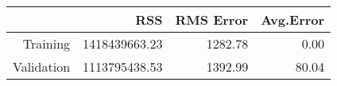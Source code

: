 \documentclass[11pt,letterpaper]{article}%
\begin{document}
\begin{center}%
\begin{tabular}{rrrr}
  \hline
 & RSS & RMS Error & Avg.Error \\
  \hline
Training & 1418439663.23 & 1282.78 & 0.00 \\
  Validation & 1113795438.53 & 1392.99 & 80.04 \\
   \hline
\end{tabular}

\end{center}
\end{document}
